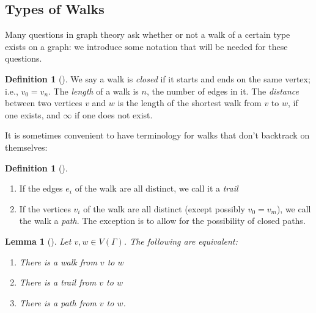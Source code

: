 \documentclass[10pt,]{book}
\theoremstyle{plain}
\newtheorem{lemma}[theorem]{Lemma}
\theoremstyle{definition}
\newtheorem{definition}[theorem]{Definition}
\theoremstyle{definition}
\theoremstyle{definition}
\begin{document}
\subsection[{Types of Walks}]{Types of Walks}\label{subsection-14}
\hypertarget{p-90}{}%
Many questions in graph theory ask whether or not a walk of a certain type exists on a graph: we introduce some notation that will be needed for these questions.%
\begin{definition}[{}]\label{definition-14}
\hypertarget{p-91}{}%
We say a walk is \emph{closed} if it starts and ends on the same vertex; i.e., \(v_0=v_n\).  The \emph{length} of a walk is \(n\), the number of edges in it.  The \emph{distance} between two vertices \(v\) and \(w\) is the length of the shortest walk from \(v\) to \(w\), if one exists, and \(\infty\) if one does not exist.%
\end{definition}
\hypertarget{p-92}{}%
It is sometimes convenient to have terminology for walks that don't backtrack on themselves:%
\begin{definition}[{}]\label{definition-15}
\leavevmode%
\begin{enumerate}
\item\hypertarget{li-22}{}If the edges \(e_i\) of the walk are all distinct, we call it a \emph{trail}%
\item\hypertarget{li-23}{}If the vertices \(v_i\) of the walk are all distinct (except possibly \(v_0=v_m\)), we call the walk a \emph{path}.  The exception is to allow for the possibility of closed paths.%
\end{enumerate}
\end{definition}
\begin{lemma}[{}]\label{lemma-2}
\hypertarget{p-93}{}%
Let \(v,w\in V(\Gamma)\).  The following are equivalent:%
\leavevmode%
\begin{enumerate}
\item\hypertarget{li-24}{}There is a walk from \(v\) to \(w\)%
\item\hypertarget{li-25}{}There is a trail from \(v\) to \(w\)%
\item\hypertarget{li-26}{}There is a path from \(v\) to \(w\).%
\end{enumerate}
\end{lemma}
\end{document}
